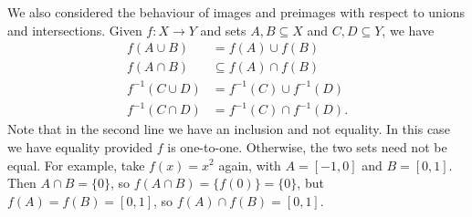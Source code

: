 \documentclass[letterpaper,12pt]{article}
\begin{document}
We also considered the behaviour of images and preimages with respect to unions and intersections. Given $f:X\to Y$ and sets $A,B\subseteq X$ and $C,D\subseteq Y$, we have
\begin{align*}
 f(A\cup B) & = f(A)\cup f(B)\\
 f(A\cap B) & \subseteq f(A)\cap f(B)\\
 f^{-1}(C\cup D) & = f^{-1}(C)\cup f^{-1}(D)\\
 f^{-1}(C\cap D) & = f^{-1}(C)\cap f^{-1}(D).
\end{align*}
Note that in the second line we have an inclusion and not equality. In this case we have equality provided $f$ is one-to-one. Otherwise, the two sets need not be equal. For example, take $f(x)=x^2$ again, with $A=[-1,0]$ and $B=[0,1]$. Then $A\cap B = \{0\}$, so $f(A\cap B) = \{f(0)\} = \{0\}$, but $f(A) = f(B) = [0,1]$, so $f(A)\cap f(B) = [0,1]$.

\bigskip
\end{document}
